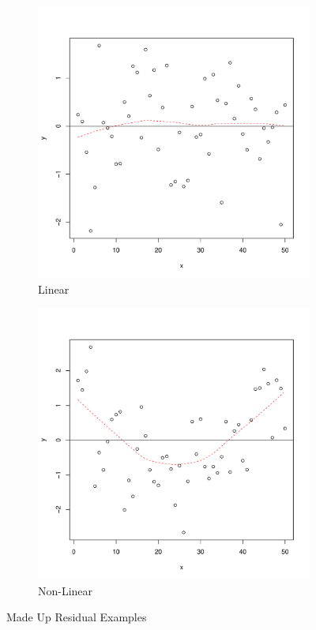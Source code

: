 \documentclass[11pt,openany]{book}
\begin{document}
\begin{figure}
        \centering
        \begin{subfigure}[b]{0.45\textwidth}
                \centering
                \includegraphics[width=\textwidth]{../15_Diagnostics/convar2.pdf}%
                \caption{Linear \label{fig:convar2}}
        \end{subfigure}
        \begin{subfigure}[b]{0.45\textwidth}
                \centering
                \includegraphics[width=\textwidth]{../15_Diagnostics/nonlin.pdf}
                \caption{Non-Linear \label{fig:nonlin}}
        \end{subfigure}
        \caption{Made Up Residual Examples}
\end{figure} 
\end{document}
